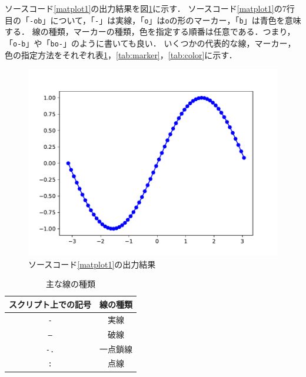 \documentclass[a4paper,12pt]{jsarticle}
\begin{document}
ソースコード\ref{matplot1}の出力結果を図\ref{fig:sinx}に示す．
ソースコード\ref{matplot1}の7行目の「\texttt{-ob}」について，「\texttt{-}」は実線，「\texttt{o}」は\texttt{o}の形のマーカー，「\texttt{b}」は青色を意味する．
線の種類，マーカーの種類，色を指定する順番は任意である．つまり，「\texttt{o-b}」や「\texttt{bo-}」のように書いても良い．
いくつかの代表的な線，マーカー，色の指定方法をそれぞれ表\ref{tab:linestyle}，\ref{tab:marker}，\ref{tab:color}に示す．

\begin{figure}[H]
    \centering
    \includegraphics[scale=0.7]{fig/sinx.pdf}
    \caption{ソースコード\ref{matplot1}の出力結果}
    \label{fig:sinx}
\end{figure}

\begin{table}[H]
    \centering
    \caption{主な線の種類}
    \begin{tabular}{c|c}
        \hline
        スクリプト上での記号 & 線の種類 \\
        \hline\hline
        \texttt{-} & 実線 \\
        \texttt{--} & 破線 \\
        \texttt{-.} & 一点鎖線 \\
        \texttt{:} & 点線 \\
        \hline
    \end{tabular}
    \label{tab:linestyle}
\end{table}
\end{document}
